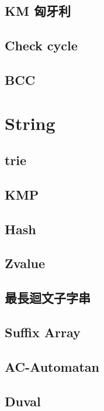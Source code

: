 \subsection{KM 匈牙利}

\subsection{Check cycle} 

\subsection{BCC} 


\section{String}
\subsection{trie} 

\subsection{KMP} 

\subsection{Hash} 

\subsection{Zvalue} 

\subsection{最長迴文子字串} 

\subsection{Suffix Array} 

\subsection{AC-Automatan} 

\subsection{Duval} 


